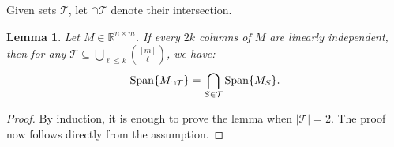\documentclass[journal, twocolumn]{IEEEtran}
\newtheorem{lemma}{Lemma}
\begin{document}
Given sets $\mathcal{T}$, let $\cap \mathcal{T}$ denote their intersection.
\begin{lemma}\label{SpanIntersectionLemma}
Let $M \in \mathbb{R}^{n \times m}$. If every $2k$ columns of $M$ are linearly independent, then for any $\mathcal{T} \subseteq \bigcup_{\ell \leq k} {[m] \choose \ell}$, we have:
\begin{align*}
\text{\rm Span}\{M_{\cap \mathcal{T}}\}  = \bigcap_{S \in \mathcal{T}} \text{\rm Span}\{M_S\}.
\end{align*}
\end{lemma}

\begin{proof}By induction, it is enough to prove the lemma when $|\mathcal{T}| = 2$. The proof now follows directly from the assumption.
\end{proof}


\end{document}

